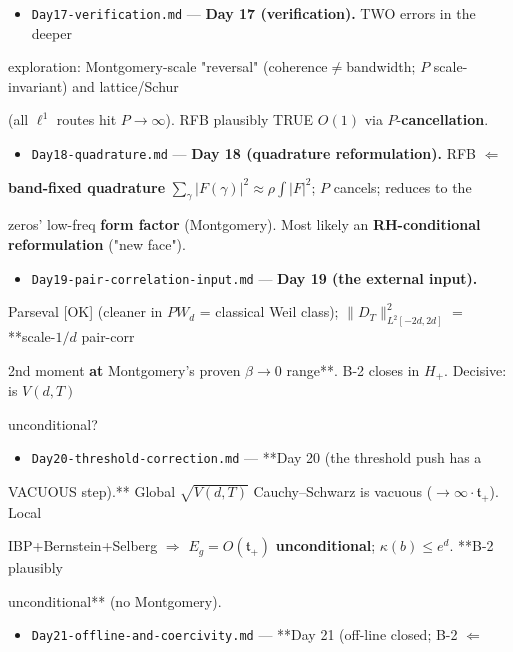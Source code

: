 \documentclass[10pt]{article}
\begin{document}
\begin{itemize}
\item \texttt{Day17-verification.md} --- \textbf{Day 17 (verification).} TWO errors in the deeper
\end{itemize}
  exploration: Montgomery-scale "reversal" (coherence\ensuremath{\ne}bandwidth; $P$ scale-invariant) and lattice/Schur\par
  (all $\ell^1$ routes hit $P\to\infty$). RFB plausibly TRUE $O(1)$ via $P$-\textbf{cancellation}.\par
\begin{itemize}
\item \texttt{Day18-quadrature.md} --- \textbf{Day 18 (quadrature reformulation).} RFB $\Leftarrow$
\end{itemize}
  \textbf{band-fixed quadrature} $\sum_\gamma|F(\gamma)|^2\approx\rho\int|F|^2$; $P$ cancels; reduces to the\par
  zeros' low-freq \textbf{form factor} (Montgomery). Most likely an \textbf{RH-conditional reformulation} ("new face").\par
\begin{itemize}
\item \texttt{Day19-pair-correlation-input.md} --- \textbf{Day 19 (the external input).}
\end{itemize}
  Parseval [OK] (cleaner in $PW_d$ = classical Weil class); $\|D_T\|^2_{L^2[-2d,2d]}$ = **scale-$1/d$ pair-corr\par
  2nd moment\textbf{ at }Montgomery's proven $\beta\to0$ range**. B-2 closes in $H_+$. Decisive: is $V(d,T)$\par
  unconditional?\par
\begin{itemize}
\item \texttt{Day20-threshold-correction.md} --- **Day 20 (the threshold push has a
\end{itemize}
  VACUOUS step).** Global $\sqrt{V(d,T)}$ Cauchy--Schwarz is vacuous ($\to\infty\cdot\mathfrak t_+$). Local\par
  IBP+Bernstein+Selberg \ensuremath{\Rightarrow} $E_g=O(\mathfrak t_+)$ \textbf{unconditional}; $\kappa(b)\le e^d$. **B-2 plausibly\par
  unconditional** (no Montgomery).\par
\begin{itemize}
\item \texttt{Day21-offline-and-coercivity.md} --- **Day 21 (off-line closed; B-2 \ensuremath{\Leftarrow}
\end{itemize}
\end{document}
